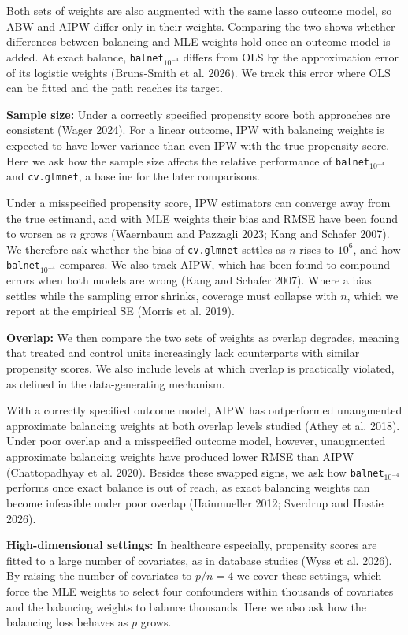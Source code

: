 \documentclass[
  12pt,
  a4paper,
]{article}
\begin{document}
Both sets of weights are also augmented with the same lasso outcome
model, so ABW and AIPW differ only in their weights. Comparing the two
shows whether differences between balancing and MLE weights hold once an
outcome model is added. At exact balance, \texttt{balnet}\(_{10^{-4}}\)
differs from OLS by the approximation error of its logistic weights
(Bruns-Smith et al. 2026). We track this error where OLS can be fitted
and the path reaches its target.

\textbf{Sample size:} Under a correctly specified propensity score both
approaches are consistent (Wager 2024). For a linear outcome, IPW with
balancing weights is expected to have lower variance than even IPW with
the true propensity score. Here we ask how the sample size affects the
relative performance of \texttt{balnet}\(_{10^{-4}}\) and
\texttt{cv.glmnet}, a baseline for the later comparisons.

Under a misspecified propensity score, IPW estimators can converge away
from the true estimand, and with MLE weights their bias and RMSE have
been found to worsen as \(n\) grows (Waernbaum and Pazzagli 2023; Kang
and Schafer 2007). We therefore ask whether the bias of
\texttt{cv.glmnet} settles as \(n\) rises to \(10^6\), and how
\texttt{balnet}\(_{10^{-4}}\) compares. We also track AIPW, which has
been found to compound errors when both models are wrong (Kang and
Schafer 2007). Where a bias settles while the sampling error shrinks,
coverage must collapse with \(n\), which we report at the empirical SE
(Morris et al. 2019).

\textbf{Overlap:} We then compare the two sets of weights as overlap
degrades, meaning that treated and control units increasingly lack
counterparts with similar propensity scores. We also include levels at
which overlap is practically violated, as defined in the data-generating
mechanism.

With a correctly specified outcome model, AIPW has outperformed
unaugmented approximate balancing weights at both overlap levels studied
(Athey et al. 2018). Under poor overlap and a misspecified outcome
model, however, unaugmented approximate balancing weights have produced
lower RMSE than AIPW (Chattopadhyay et al. 2020). Besides these swapped
signs, we ask how \texttt{balnet}\(_{10^{-4}}\) performs once exact
balance is out of reach, as exact balancing weights can become
infeasible under poor overlap (Hainmueller 2012; Sverdrup and Hastie
2026).

\textbf{High-dimensional settings:} In healthcare especially, propensity
scores are fitted to a large number of covariates, as in database
studies ({Wyss et al.} 2026). By raising the number of covariates to
\(p/n = 4\) we cover these settings, which force the MLE weights to
select four confounders within thousands of covariates and the balancing
weights to balance thousands. Here we also ask how the balancing loss
behaves as \(p\) grows.
\end{document}
